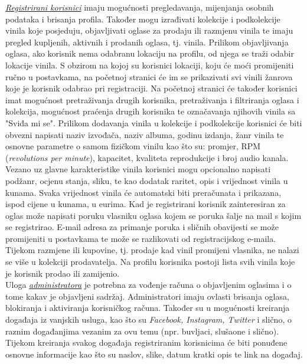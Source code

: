 	 \textit{\underline{Registrirani korisnici}} imaju mogućnosti pregledavanja, mijenjanja osobnih podataka i brisanja profila. Također mogu izrađivati kolekcije i podkolekcije vinila koje posjeduju, objavljivati oglase za prodaju ili razmjenu vinila te imaju pregled kupljenih, aktivnih i prodanih oglasa, tj. vinila. Prilikom objavljivanja oglasa, ako korisnik nema odabranu lokaciju na profilu, od njega se traži odabir lokacije vinila. S obzirom na kojoj su korisnici lokaciji, koju će moći promijeniti ručno u postavkama, na početnoj stranici će im se prikazivati svi vinili žanrova koje je korisnik odabrao pri registraciji. Na početnoj stranici će također korisnici imat mogućnost pretraživanja drugih korisnika, pretraživanja i filtriranja oglasa i kolekcija, mogućnost praćenja drugih korisnika te označavanja njihovih vinila sa "Sviđa mi se". Prilikom dodavanja vinila u kolekcije i podkolekcije korisnici će biti obvezni napisati naziv izvođača, naziv albuma, godinu izdanja, žanr vinila te osnovne parametre o samom fizičkom vinilu kao što su: promjer, RPM (\textit{revolutions per minute}), kapacitet, kvaliteta reprodukcije i broj audio kanala. Vezano uz glavne karakteristike vinila korisnici mogu opcionalno napisati podžanr, ocjenu stanja, sliku, te kao dodatak raritet, opis i vrijednost vinila u kunama. Svaka vrijednost vinila će automatski biti preračunata i prikazana, ispod cijene u kunama, u eurima. Kad je registrirani korisnik zainteresiran za oglas može napisati poruku vlasniku oglasa kojem se poruka šalje na mail s kojim se registrirao. E-mail adresa za primanje poruka i sličnih obavijesti se može promijeniti u postavkama te može se razlikovati od registracijskog e-maila.\\
	 
	  \text Tijekom razmjene ili kupovine, tj. prodaje kad vinil promijeni vlasnika, ne nalazi se više u kolekciji prodavatelja. Na profilu korisnika postoji lista svih vinila koje je korisnik prodao ili zamijenio.\\
	 
	 Uloga \textit{\underline{administratora}} je potrebna za vođenje računa o objavljenim oglasima i o tome kakav je objavljeni sadržaj. Administratori imaju ovlasti brisanja oglasa, blokiranja i aktiviranja korisničkog računa. Također su u mogućnosti kreiranja događaja iz vanjskih usluga, kao što su \textit{Facebook, Instagram, Twitter} i slično, o raznim događanjima vezanim za ovu temu (npr. buvljaci, slušaone i slično). Tijekom kreiranja svakog događaja registriranim korisnicima će biti ponuđene osnovne informacije kao što su naslov, slike, datum kratki opis te link na događaj.\\
	 
